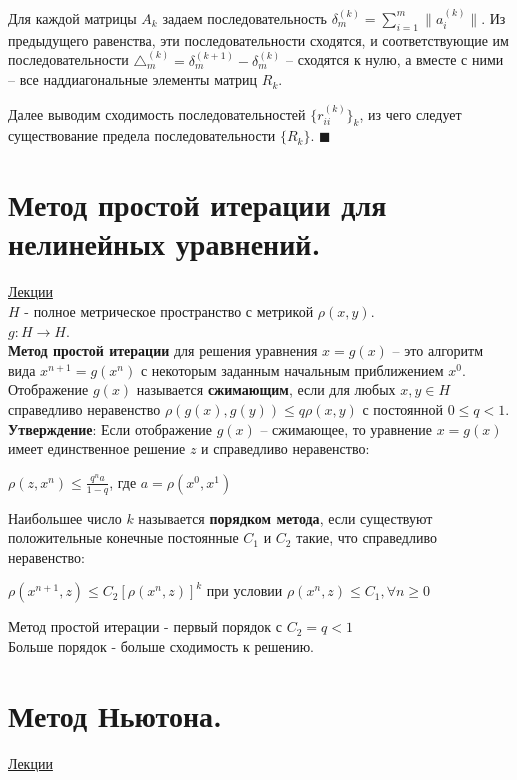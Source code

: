 \documentclass[specialist, subf, href, colorlinks=true, 12pt, times, mtpro, final]{disser}
\theoremstyle{definition}
\begin{document}
{Для каждой матрицы $A_k$ задаем последовательность $\delta^{(k)}_m = \sum\limits^m_{i=1} \|a^{(k)}_i\|$. Из предыдущего равенства, эти последовательности сходятся, и соответствующие им последовательности $\triangle^{(k)}_m = \delta^{(k+1)}_m - \delta^{(k)}_m$ \--- сходятся к нулю, а вместе с ними \--- все наддиагональные элементы матриц $R_k$.

Далее выводим сходимость последовательностей $\{r^{(k)}_{ii}\}_k$, из чего следует существование предела последовательности $\{R_k\}$. $\blacksquare$



\section {Метод простой итерации для нелинейных уравнений.}
    \hyperlink {lects.82}{Лекции}\\
$H$  - полное метрическое пространство с метрикой $\rho(x,y)$.\\
$g:H \rightarrow H$.\\
\textbf{Метод простой итерации} для решения уравнения $x = g(x)$ \--- это алгоритм вида $x^{n+1} = g(x^n)$ с некоторым заданным начальным приближением $x^0$.\\
Отображение $g(x)$ называется \textbf{сжимающим}, если для любых $x, y \in H$ справедливо неравенство $\rho(g(x), g(y)) \leq q\rho(x,y)$ с постоянной $0 \leq q < 1$.\\
\noindent\textbf{Утверждение}: Если отображение $g(x)$ \--- сжимающее, то уравнение $x=g(x)$  имеет единственное решение $z$ и справедливо неравенство:
\begin{center}
$\rho (z, x^n) \leq \frac{q^na}{1-q}$, где $a = \rho (x^0, x^1)$
\end{center}

Наибольшее число $k$ называется \textbf{порядком метода}, если существуют положительные конечные постоянные $C_1$ и $C_2$ такие, что справедливо неравенство:
\begin{center}
$\rho(x^{n+1}, z) \leq C_2 [\rho(x^n,z)]^k$ 
при условии
 $ \rho (x^n,z) \leq C_1, \forall n \geq 0$
\end{center}

Метод простой итерации - первый порядок с $C_2 = q < 1$\\
Больше порядок - больше сходимость к решению.
    

\section {Метод Ньютона.}
    \hyperlink {lects.83}{Лекции}\\

}
\end{document}
